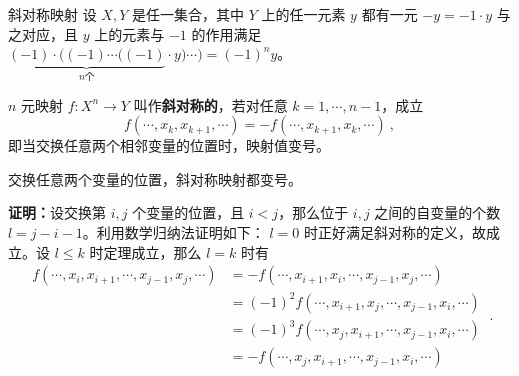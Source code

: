
\begin{issues}
\issueDraft
{}
\end{issues}


\begin{definition}{斜对称映射}\label{AntMap_def1}
设 $X,Y$ 是任一集合，其中 $Y$ 上的任一元素 $y$ 都有一元 $-y=-1\cdot y$ 与之对应，且 $y$ 上的元素与 $-1$ 的作用满足 $\underbrace{(-1)\cdot((-1)\cdots((-1)}_{n\text{个}}\cdot y)\cdots)=(-1)^n y$。

 $n$ 元映射 $f:X^n\rightarrow Y$ 叫作\textbf{斜对称的}，若对任意 $k=1,\cdots,n-1$，成立
\begin{equation}\label{AntMap_eq3}
f(\cdots,x_k,x_{k+1},\cdots)=-f(\cdots,x_{k+1},x_k,\cdots)~,
\end{equation}
即当交换任意两个相邻变量的位置时，映射值变号。
\end{definition}
\begin{theorem}{}\label{AntMap_the1}
交换任意两个变量的位置，斜对称映射都变号。
\end{theorem}
\textbf{证明：}设交换第 $i,j$ 个变量的位置，且 $i<j$，那么位于 $i,j$ 之间的自变量的个数 $l=j-i-1$。利用数学归纳法证明如下： $l=0$ 时正好满足斜对称的定义，故成立。设 $l\leq k$ 时定理成立，那么 $l=k$ 时有
\begin{equation}
\begin{aligned}
f(\cdots,x_i,x_{i+1},\cdots,x_{j-1},x_j,\cdots)&=-f(\cdots,x_{i+1},x_{i},\cdots,x_{j-1},x_j,\cdots)\\
&=(-1)^2 f(\cdots,x_{i+1},x_{j},\cdots,x_{j-1},x_i,\cdots)\\
&=(-1)^3 f(\cdots,x_{j},x_{i+1},\cdots,x_{j-1},x_i,\cdots)\\
&=-f(\cdots,x_{j},x_{i+1},\cdots,x_{j-1},x_i,\cdots)
\end{aligned}~.
\end{equation}
  
